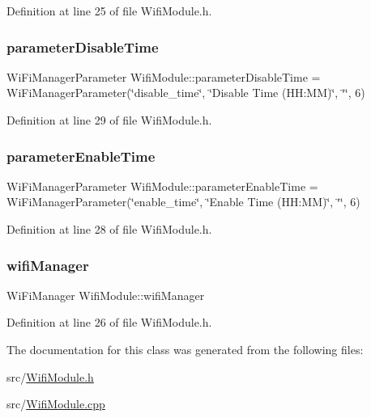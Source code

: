 Definition at line 25 of file Wifi\+Module.\+h.

\mbox{\label{class_wifi_module_a8b457a11d91c9f4a5f88a4087580f8b8}} 
\subsubsection{\texorpdfstring{parameterDisableTime}{parameterDisableTime}}
{\footnotesize\ttfamily Wi\+Fi\+Manager\+Parameter Wifi\+Module\+::parameter\+Disable\+Time = Wi\+Fi\+Manager\+Parameter(\char`\"{}disable\+\_\+time\char`\"{}, \char`\"{}Disable Time (H\+H\+:\+MM)\char`\"{}, \char`\"{}\char`\"{}, 6)\hspace{0.3cm}{\ttfamily [private]}}



Definition at line 29 of file Wifi\+Module.\+h.

\mbox{\label{class_wifi_module_ad138f4478faab934496f1b5679298261}} 
\subsubsection{\texorpdfstring{parameterEnableTime}{parameterEnableTime}}
{\footnotesize\ttfamily Wi\+Fi\+Manager\+Parameter Wifi\+Module\+::parameter\+Enable\+Time = Wi\+Fi\+Manager\+Parameter(\char`\"{}enable\+\_\+time\char`\"{}, \char`\"{}Enable Time (H\+H\+:\+MM)\char`\"{}, \char`\"{}\char`\"{}, 6)\hspace{0.3cm}{\ttfamily [private]}}



Definition at line 28 of file Wifi\+Module.\+h.

\mbox{\label{class_wifi_module_ad569429d746a3db2fe153e4cf063a07d}} 
\subsubsection{\texorpdfstring{wifiManager}{wifiManager}}
{\footnotesize\ttfamily Wi\+Fi\+Manager Wifi\+Module\+::wifi\+Manager\hspace{0.3cm}{\ttfamily [private]}}



Definition at line 26 of file Wifi\+Module.\+h.



The documentation for this class was generated from the following files\+:\begin{DoxyCompactItemize}
\item 
src/\mbox{\hyperlink{_wifi_module_8h}{Wifi\+Module.\+h}}\item 
src/\mbox{\hyperlink{_wifi_module_8cpp}{Wifi\+Module.\+cpp}}\end{DoxyCompactItemize}
